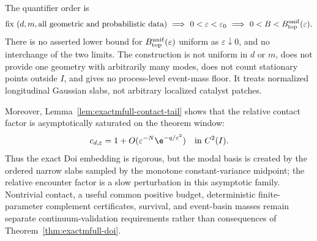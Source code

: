 \begin{remark}
\label{rem:exactmfull-scope}
The quantifier order is
\begin{equation}
 \text{fix }(d,m,\text{all geometric and probabilistic data})
 \ \Longrightarrow\ 
 0<\varepsilon<\varepsilon_0
 \ \Longrightarrow\ 
 0<B<B_{\rm top}^{\rm unif}(\varepsilon).
 \label{eq:exactmfull-quantifier-order}
\end{equation}
There is no asserted lower bound for
\(B_{\rm top}^{\rm unif}(\varepsilon)\) uniform as
\(\varepsilon\downarrow0\), and no interchange of the two limits.  The
construction is not uniform in \(d\) or \(m\), does not provide one geometry
with arbitrarily many modes, does not count stationary points outside \(I\),
and gives no process-level event-mass floor.  It treats normalized
longitudinal Gaussian slabs, not arbitrary localized catalyst patches.

Moreover, Lemma~\ref{lem:exactmfull-contact-tail} shows that the relative
contact factor is asymptotically saturated on the theorem window:
\begin{equation}
 c_{d,\varepsilon}=1
 +O(\varepsilon^{-N}\e^{-q/\varepsilon^2})
 \quad\text{in }C^2(I).
 \label{eq:exactmfull-saturated-contact}
\end{equation}
Thus the exact Doi embedding is rigorous, but the modal basis is created by
the ordered narrow slabs sampled by the monotone constant-variance midpoint;
the relative encounter factor is a slow perturbation in this asymptotic
family.  Nontrivial contact, a useful common positive budget, deterministic
finite-parameter complement certificates, survival, and event-basin masses
remain separate continuum-validation requirements rather than consequences
of Theorem~\ref{thm:exactmfull-doi}.
\end{remark}
